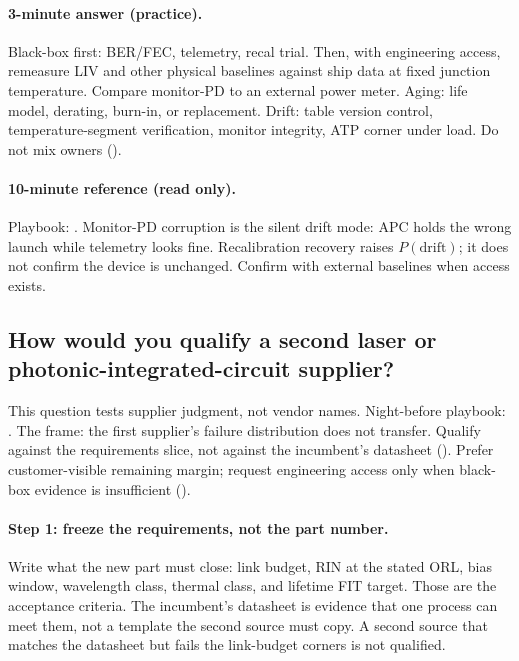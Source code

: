\paragraph{3-minute answer (practice).}
Black-box first: BER/FEC, telemetry, recal trial. Then, with engineering
access, remeasure LIV and other physical baselines against ship data at fixed
junction temperature. Compare monitor-PD to an external power meter. Aging:
life model, derating, burn-in, or replacement. Drift: table version control,
temperature-segment verification, monitor integrity, ATP corner under load.
Do not mix owners ().

\paragraph{10-minute reference (read only).}
Playbook: . Monitor-PD corruption is the silent drift
mode: APC holds the wrong launch while telemetry looks fine. Recalibration
recovery raises $P(\mathrm{drift})$; it does not confirm the device is
unchanged. Confirm with external baselines when access exists.

\subsection{How would you qualify a second laser or photonic-integrated-circuit
supplier?}
\label{sec:interview-worked-second-source}

This question tests supplier judgment, not vendor names. Night-before
playbook: . The frame: the first supplier's failure
distribution does not transfer. Qualify against the requirements slice, not
against the incumbent's datasheet ().
Prefer customer-visible remaining margin; request engineering access only when
black-box evidence is insufficient ().


\paragraph{Step 1: freeze the requirements, not the part number.}
Write what the new part must close: link budget, RIN at the
stated ORL, bias window, wavelength class, thermal class, and
lifetime FIT target. Those are the acceptance criteria. The
incumbent's datasheet is evidence that one process can meet them, not a
template the second source must copy. A second source that matches the
datasheet but fails the link-budget corners is not qualified.

